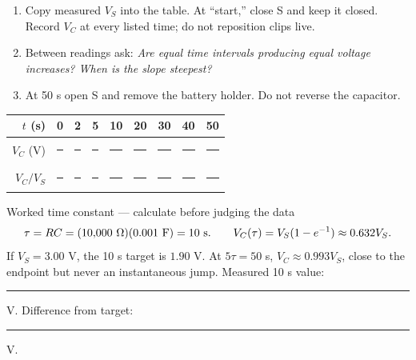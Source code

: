 \begin{enumerate}
\item Copy measured \(V_S\) into the table. At “start,” close S and keep it
  closed. Record \(V_C\) at every listed time; do not reposition clips live.
\item Between readings ask: \textit{Are equal time intervals producing equal
  voltage increases? When is the slope steepest?}
\item At 50 s open S and remove the battery holder. Do not reverse the capacitor.
\end{enumerate}

\begin{center}\small
\begin{tabular}{@{}r*{8}{c}@{}}
\toprule
\(t\) (s) & 0 & 2 & 5 & 10 & 20 & 30 & 40 & 50\\
\midrule
\(V_C\) (V) & \rule{.72cm}{.3pt}&\rule{.72cm}{.3pt}&\rule{.72cm}{.3pt}&
\rule{.72cm}{.3pt}&\rule{.72cm}{.3pt}&\rule{.72cm}{.3pt}&
\rule{.72cm}{.3pt}&\rule{.72cm}{.3pt}\\
\(V_C/V_S\) & \rule{.72cm}{.3pt}&\rule{.72cm}{.3pt}&\rule{.72cm}{.3pt}&
\rule{.72cm}{.3pt}&\rule{.72cm}{.3pt}&\rule{.72cm}{.3pt}&
\rule{.72cm}{.3pt}&\rule{.72cm}{.3pt}\\
\bottomrule
\end{tabular}
\end{center}

\begin{center}
\end{center}

\begin{teloscard}{Worked time constant — calculate before judging the data}
\[
\tau=RC=(10{,}000\ \Omega)(0.001\ {\rm F})=10\ {\rm s}.
\qquad
V_C(\tau)=V_S(1-e^{-1})\approx0.632V_S.
\]
If \(V_S=3.00\) V, the 10 s target is \(1.90\) V. At \(5\tau=50\) s,
\(V_C\approx0.993V_S\), close to the endpoint but never an instantaneous jump.
Measured 10 s value: \rule{1.2cm}{.3pt} V. Difference from target:
\rule{1.2cm}{.3pt} V.
\end{teloscard}

